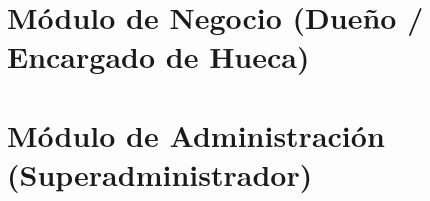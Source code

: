 \newpage
\section{Módulo de Negocio (Dueño / Encargado de Hueca)}
\skipnewpagetrue


\newpage
\section{Módulo de Administración (Superadministrador)}
\skipnewpagetrue




